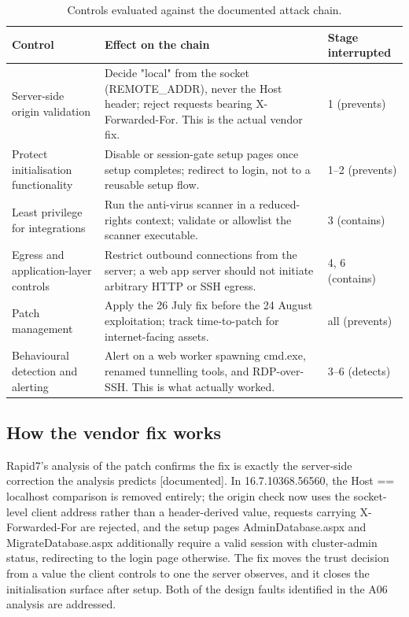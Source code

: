 \documentclass[11pt,a4paper]{article}
\newcommand{\code}[1]{{\small\ttfamily #1}}
\newcommand{\tier}[1]{{\small\color{meta}\textsf{[#1]}}}
\begin{document}
\begin{table}[htbp]
\centering
\caption{Controls evaluated against the documented attack chain.}
\label{tab:controls}
\small
\begin{tabularx}{\textwidth}{p{} X p{}}
\toprule
\rowcolor{headergrey}\textbf{Control} & \textbf{Effect on the chain} & \textbf{Stage interrupted} \\
\midrule
Server-side origin validation & Decide "local" from the socket (\code{REMOTE\_ADDR}), never the \code{Host} header; reject requests bearing \code{X-Forwarded-For}. This is the actual vendor fix. & 1 (prevents) \\
Protect initialisation functionality & Disable or session-gate setup pages once setup completes; redirect to login, not to a reusable setup flow. & 1--2 (prevents) \\
Least privilege for integrations & Run the anti-virus scanner in a reduced-rights context; validate or allowlist the scanner executable. & 3 (contains) \\
Egress and application-layer controls & Restrict outbound connections from the server; a web app server should not initiate arbitrary HTTP or SSH egress. & 4, 6 (contains) \\
Patch management & Apply the 26 July fix before the 24 August exploitation; track time-to-patch for internet-facing assets. & all (prevents) \\
Behavioural detection and alerting & Alert on a web worker spawning \code{cmd.exe}, renamed tunnelling tools, and RDP-over-SSH. This is what actually worked. & 3--6 (detects) \\
\bottomrule
\end{tabularx}
\end{table}

\subsection{How the vendor fix works}

Rapid7's analysis of the patch confirms the fix is exactly the server-side correction the analysis predicts \tier{documented}. In 16.7.10368.56560, the \code{Host == localhost} comparison is removed entirely; the origin check now uses the socket-level client address rather than a header-derived value, requests carrying \code{X-Forwarded-For} are rejected, and the setup pages \code{AdminDatabase.aspx} and \code{MigrateDatabase.aspx} additionally require a valid session with cluster-admin status, redirecting to the login page otherwise. The fix moves the trust decision from a value the client controls to one the server observes, and it closes the initialisation surface after setup. Both of the design faults identified in the A06 analysis are addressed.
\end{document}
